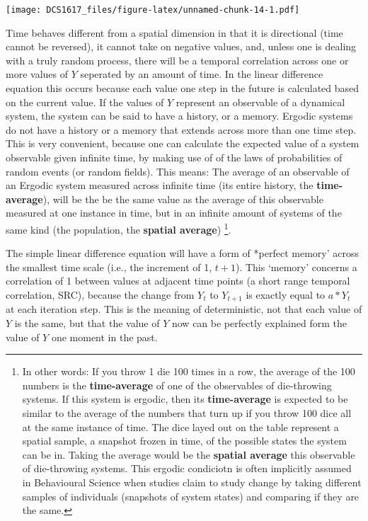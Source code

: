 \documentclass[]{book}
\let\rmarkdownfootnote\footnote%
\def\footnote{\protect\rmarkdownfootnote}
\begin{document}
\texttt{[image: DCS1617\_files/figure-latex/unnamed-chunk-14-1.pdf]}

Time behaves different from a spatial dimension in that it is
directional (time cannot be reversed), it cannot take on negative
values, and, unless one is dealing with a truly random process, there
will be a temporal correlation across one or more values of \(Y\)
seperated by an amount of time. In the linear difference equation this
occurs because each value one step in the future is calculated based on
the current value. If the values of \(Y\) represent an observable of a
dynamical system, the system can be said to have a history, or a memory.
Ergodic systems do not have a history or a memory that extends across
more than one time step. This is very convenient, because one can
calculate the expected value of a system observable given infinite time,
by making use of of the laws of probabilities of random events (or
random fields). This means: The average of an observable of an Ergodic
system measured across infinite time (its entire history, the
\textbf{time-average}), will be the be the same value as the average of
this observable measured at one instance in time, but in an infinite
amount of systems of the same kind (the population, the \textbf{spatial
average}) \footnote{In other words: If you throw 1 die 100 times in a
  row, the average of the 100 numbers is the \textbf{time-average} of
  one of the observables of die-throwing systems. If this system is
  ergodic, then its \textbf{time-average} is expected to be similar to
  the average of the numbers that turn up if you throw 100 dice all at
  the same instance of time. The dice layed out on the table represent a
  spatial sample, a snapshot frozen in time, of the possible states the
  system can be in. Taking the average would be the \textbf{spatial
  average} this observable of die-throwing systems. This ergodic
  condiciotn is often implicitly assumed in Behavioural Science when
  studies claim to study change by taking different samples of
  individuals (snapshots of system states) and comparing if they are the
  same.}.

The simple linear difference equation will have a form of *perfect
memory' across the smallest time scale (i.e., the increment of 1,
\(t+1\)). This `memory' concerns a correlation of 1 between values at
adjacent time points (a short range temporal correlation, SRC), because
the change from \(Y_t\) to \(Y_{t+1}\) is exactly equal to \(a * Y_t\)
at each iteration step. This is the meaning of deterministic, not that
each value of \(Y\) is the same, but that the value of \(Y\) now can be
perfectly explained form the value of \(Y\) one moment in the past.
\end{document}
